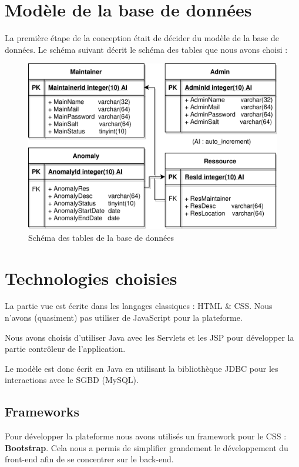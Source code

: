 \section{Modèle de la base de données}
La première étape de la conception était de décider du modèle de la base de données. Le schéma
suivant décrit le schéma des tables que nous avons choisi :\newline

\begin{figure}[!h]
    \centering
    \includegraphics[width=\textwidth]{img/schemaSQL.png}
    \caption{Schéma des tables de la base de données}
    \label{fig:schemaSQL}
\end{figure}
\newpage

\section{Technologies choisies}
La partie vue est écrite dans les langages classiques : HTML \& CSS. Nous n'avons (quasiment) pas
utiliser de JavaScript pour la plateforme.\newline

Nous avons choisis d'utiliser Java avec les Servlets et les JSP pour développer la partie
contrôleur de l'application.\newline

Le modèle est donc écrit en Java en utilisant la bibliothèque JDBC pour les interactions avec
le SGBD (MySQL).

\subsection{Frameworks}
Pour développer la plateforme nous avons utilisés un framework pour le CSS :
\textbf{Bootstrap}.
Cela nous a permis de simplifier grandement le développement du front-end afin de se concentrer
sur le back-end.

